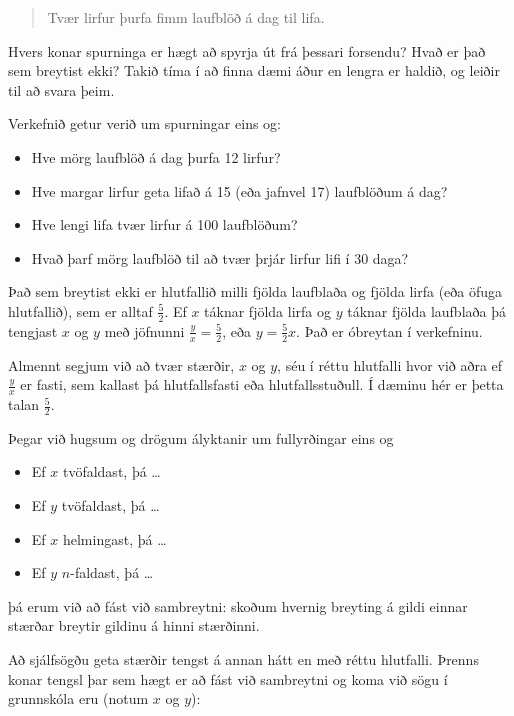 \documentclass[
  icelandic,
]{book}
\providecommand{\tightlist}{%
  \setlength{\itemsep}{0pt}\setlength{\parskip}{0pt}}
\begin{document}
\begin{quote}
Tvær lirfur þurfa fimm laufblöð á dag til lifa.
\end{quote}

Hvers konar spurninga er hægt að spyrja út frá þessari forsendu? Hvað er það sem breytist ekki? Takið tíma í að finna dæmi áður en lengra er haldið, og leiðir til að svara þeim.

Verkefnið getur verið um spurningar eins og:

\begin{itemize}
\tightlist
\item
  Hve mörg laufblöð á dag þurfa 12 lirfur?
\item
  Hve margar lirfur geta lifað á 15 (eða jafnvel 17) laufblöðum á dag?
\item
  Hve lengi lifa tvær lirfur á 100 laufblöðum?
\item
  Hvað þarf mörg laufblöð til að tvær þrjár lirfur lifi í 30 daga?
\end{itemize}

Það sem breytist ekki er hlutfallið milli fjölda laufblaða og fjölda lirfa (eða öfuga hlutfallið), sem er alltaf \(\frac{5}{2}\). Ef \(x\) táknar fjölda lirfa og \(y\) táknar fjölda laufblaða þá tengjast \(x\) og \(y\) með jöfnunni \(\frac{y}{x}=\frac{5}{2}\), eða \(y=\frac{5}{2}x\). Það er óbreytan í verkefninu.

Almennt segjum við að tvær stærðir, \(x\) og \(y\), séu í réttu hlutfalli hvor við aðra ef \(\frac{y}{x}\) er fasti, sem kallast þá hlutfallsfasti eða hlutfallsstuðull. Í dæminu hér er þetta talan \(\frac{5}{2}\).

Þegar við hugsum og drögum ályktanir um fullyrðingar eins og

\begin{itemize}
\tightlist
\item
  Ef \(x\) tvöfaldast, þá \ldots{}
\item
  Ef \(y\) tvöfaldast, þá \ldots{}
\item
  Ef \(x\) helmingast, þá \ldots{}
\item
  Ef \(y\) \(n\)-faldast, þá \ldots{}
\end{itemize}

þá erum við að fást við sambreytni: skoðum hvernig breyting á gildi einnar stærðar breytir gildinu á hinni stærðinni.

Að sjálfsögðu geta stærðir tengst á annan hátt en með réttu hlutfalli. Þrenns konar tengsl þar sem hægt er að fást við sambreytni og koma við sögu í grunnskóla eru (notum \(x\) og \(y\)):
\end{document}
